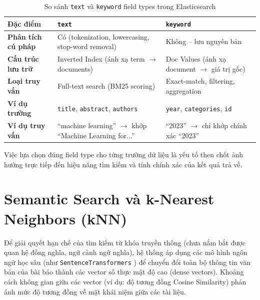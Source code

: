 \begin{table}[H]
\centering
\begin{tabular}{|p{3cm}|p{5.5cm}|p{5.5cm}|}
\hline
\textbf{Đặc điểm} & \textbf{\texttt{text}} & \textbf{\texttt{keyword}} \\ \hline
\textbf{Phân tích cú pháp} & Có (tokenization, lowercasing, stop-word removal) & Không -- lưu nguyên bản \\ \hline
\textbf{Cấu trúc lưu trữ} & Inverted Index (ánh xạ term $\to$ documents) & Doc Values (ánh xạ document $\to$ giá trị gốc) \\ \hline
\textbf{Loại truy vấn} & Full-text search (BM25 scoring) & Exact-match, filtering, aggregation \\ \hline
\textbf{Ví dụ trường} & \texttt{title}, \texttt{abstract}, \texttt{authors} & \texttt{year}, \texttt{categories}, \texttt{id} \\ \hline
\textbf{Ví dụ truy vấn} & ``machine learning'' $\to$ khớp ``Machine Learning for...'' & ``2023'' $\to$ chỉ khớp chính xác ``2023'' \\ \hline
\end{tabular}
\caption{So sánh \texttt{text} và \texttt{keyword} field types trong Elasticsearch}
\label{tab:text-vs-keyword}
\end{table}

Việc lựa chọn đúng field type cho từng trường dữ liệu là yếu tố then chốt ảnh hưởng trực tiếp đến hiệu năng tìm kiếm và tính chính xác của kết quả trả về.

\section{Semantic Search và k-Nearest Neighbors (kNN)}
Để giải quyết hạn chế của tìm kiếm từ khóa truyền thống (chưa nắm bắt được quan hệ đồng nghĩa, ngữ cảnh ngữ nghĩa), hệ thống áp dụng các mô hình ngôn ngữ học sâu (như \texttt{SentenceTransformers} \cite{reimers2019sentencebert}) để chuyển đổi toàn bộ thông tin văn bản của bài báo thành các vector số thực mật độ cao (dense vectors). Khoảng cách không gian giữa các vector (ví dụ: độ tương đồng Cosine Similarity) phản ánh mức độ tương đồng về mặt khái niệm giữa các tài liệu.

